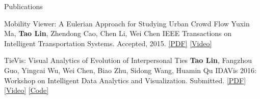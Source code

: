 \documentclass{resume} %
\begin{document}
\begin{rSection}{Publications}
	
	\begin{rPublication}
		{Mobility Viewer: A Eulerian Approach for Studying Urban Crowd Flow}
		{Yuxin Ma, \textbf{Tao Lin}, Zhendong Cao, Chen Li, Wei Chen}
		{IEEE Transactions on Intelligent Transportation Systems. Accepted, 2015.}
		{\href{http://nblintao.github.io/pdf/Mobility\%20Viewer.pdf}{[PDF]}
			\href{https://youtu.be/m0HgyEsh0tI}{[Video]}}
	\end{rPublication}
	
	
	\begin{rPublication}
		{TieVis: Visual Analytics of Evolution of Interpersonal Ties}
		{\textbf{Tao Lin}, Fangzhou Guo, Yingcai Wu, Wei Chen, Biao Zhu, Sidong Wang, Huamin Qu}
		{IDAVis 2016: Workshop on Intelligent Data Analytics and Visualization. Submitted.}
		{	\href{http://nblintao.github.io/pdf/TieVis.pdf}{[PDF]}
			\href{https://youtu.be/xsr4YXOo1WA}{[Video]}
			\href{https://github.com/nblintao/TieVis}{[Code]}}
		
	\end{rPublication}
	
\end{rSection}

\end{document}
